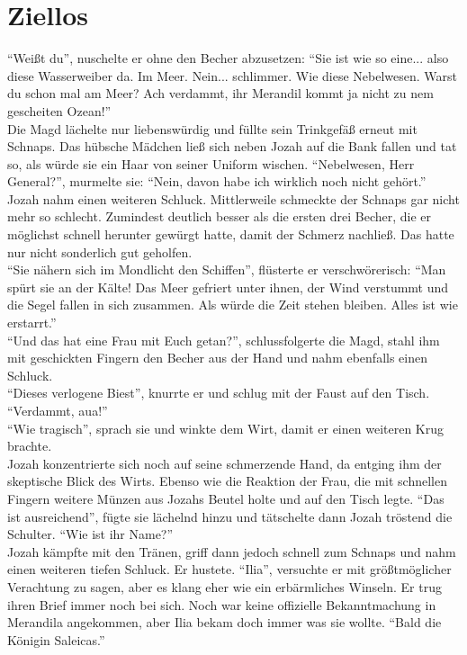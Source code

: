 \chapter{Ziellos}

``Weißt du'', nuschelte er ohne den Becher abzusetzen: ``Sie ist wie so eine... also diese 
Wasserweiber da. Im Meer. Nein... schlimmer. Wie diese Nebelwesen. Warst du schon mal am Meer? Ach 
verdammt, ihr Merandil kommt ja nicht zu nem gescheiten Ozean!''\\
Die Magd lächelte nur liebenswürdig und füllte sein Trinkgefäß erneut mit Schnaps. Das hübsche 
Mädchen ließ sich neben Jozah auf die Bank fallen und tat so, als würde sie ein Haar von seiner 
Uniform wischen. ``Nebelwesen, Herr General?'', murmelte sie: ``Nein, davon habe ich wirklich noch 
nicht gehört.''\\
Jozah nahm einen weiteren Schluck. Mittlerweile schmeckte der Schnaps gar nicht mehr so schlecht. 
Zumindest deutlich besser als die ersten drei Becher, die er möglichst schnell herunter gewürgt 
hatte, damit der Schmerz nachließ. Das hatte nur nicht sonderlich gut geholfen.\\
``Sie nähern sich im Mondlicht den Schiffen'', flüsterte er verschwörerisch: ``Man spürt sie an der 
Kälte! Das Meer gefriert unter ihnen, der Wind verstummt und die Segel fallen in sich zusammen. Als 
würde die Zeit stehen bleiben. Alles ist wie erstarrt.''\\
``Und das hat eine Frau mit Euch getan?'', schlussfolgerte die Magd, stahl ihm mit geschickten 
Fingern den Becher aus der Hand und nahm ebenfalls einen Schluck.\\
``Dieses verlogene Biest'', knurrte er und schlug mit der Faust auf den Tisch. ``Verdammt, aua!''\\
``Wie tragisch'', sprach sie und winkte dem Wirt, damit er einen weiteren Krug brachte.\\
Jozah konzentrierte sich noch auf seine schmerzende Hand, da entging ihm der skeptische Blick des 
Wirts. Ebenso wie die Reaktion der Frau, die mit schnellen Fingern weitere Münzen aus Jozahs Beutel 
holte und auf den Tisch legte. ``Das ist ausreichend'', fügte sie lächelnd hinzu und tätschelte 
dann Jozah tröstend die Schulter. ``Wie ist ihr Name?''\\
Jozah kämpfte mit den Tränen, griff dann jedoch schnell zum Schnaps und nahm einen weiteren tiefen 
Schluck. Er hustete. ``Ilia'', versuchte er mit größtmöglicher Verachtung zu sagen, aber es klang 
eher wie ein erbärmliches Winseln. Er trug ihren Brief immer noch bei sich. Noch war keine offizielle Bekanntmachung in Merandila angekommen, aber Ilia bekam doch immer was sie wollte. ``Bald die Königin Saleicas.''\\
